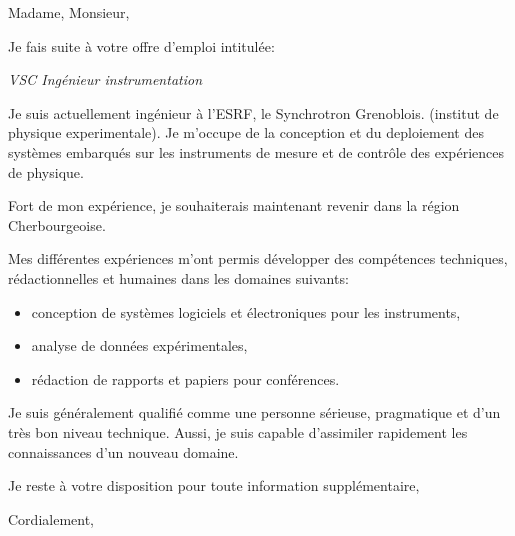 \documentclass[11pt]{letter} %
\begin{document}
\signature{Le Mentec Fabien}               %
\longindentation=0pt                       %
\let\raggedleft\raggedright                %
 
\begin{letter}{}
\vfill %

\opening{Madame, Monsieur,} 

\noindent
Je fais suite \`{a} votre offre d'emploi intitul\'{e}e:
\begin{center}
  \textit{VSC Ing\'{e}nieur instrumentation}
\end{center}

\noindent
Je suis actuellement ing\'{e}nieur \`{a} l'ESRF, le Synchrotron Grenoblois.
(institut de physique experimentale). Je m'occupe de la conception et du deploiement
des syst\`{e}mes embarqu\'{e}s sur les instruments de mesure et de contr\^{o}le des
exp\'{e}riences de physique.

\noindent
Fort de mon exp\'{e}rience, je souhaiterais maintenant revenir dans la r\'{e}gion
Cherbourgeoise.

\noindent
Mes diff\'{e}rentes exp\'{e}riences m'ont permis d\'{e}velopper des comp\'{e}tences
techniques, r\'{e}dactionnelles et humaines dans les domaines suivants:
\begin{itemize}
\item conception de syst\`{e}mes logiciels et \'{e}lectroniques pour les instruments,
\item analyse de donn\'{e}es exp\'{e}rimentales,
\item r\'{e}daction de rapports et papiers pour conf\'{e}rences.
\end{itemize}

\noindent
Je suis g\'{e}n\'{e}ralement qualifi\'{e} comme une personne s\'{e}rieuse, pragmatique
et d'un tr\`{e}s bon niveau technique. Aussi, je suis capable d'assimiler rapidement
les connaissances d'un nouveau domaine.

\noindent
Je reste \`{a} votre disposition pour toute information suppl\'{e}mentaire,

\closing{Cordialement,}

 
\end{letter}
 
\end{document}
